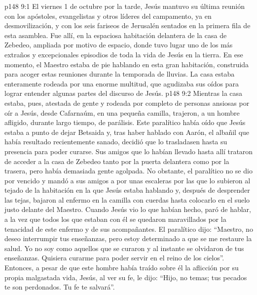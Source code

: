 \vs p148 9:1 El viernes 1 de octubre por la tarde, Jesús mantuvo su última reunión con los apóstoles, evangelistas y otros líderes del campamento, ya en desmovilización, y con los seis fariseos de Jerusalén sentados en la primera fila de esta asamblea. Fue allí, en la espaciosa habitación delantera de la casa de Zebedeo, ampliada por motivo de espacio, donde tuvo lugar uno de los más extraños y excepcionales episodios de toda la vida de Jesús en la tierra. En ese momento, el Maestro estaba de pie hablando en esta gran habitación, construida para acoger estas reuniones durante la temporada de lluvias. La casa estaba enteramente rodeada por una enorme multitud, que agudizaba sus oídos para lograr entender algunas partes del discurso de Jesús.
\vs p148 9:2 Mientras la casa estaba, pues, atestada de gente y rodeada por completo de personas ansiosas por oír a Jesús, desde Cafarnaúm, en una pequeña camilla, trajeron, a un hombre afligido, durante largo tiempo, de parálisis. Este paralítico había oído que Jesús estaba a punto de dejar Betsaida y, tras haber hablado con Aarón, el albañil que había resultado recientemente sanado, decidió que lo trasladasen hasta su presencia para poder curarse. Sus amigos que lo habían llevado hasta allí trataron de acceder a la casa de Zebedeo tanto por la puerta delantera como por la trasera, pero había demasiada gente agolpada. No obstante, el paralítico no se dio por vencido y mandó a sus amigos a por unas escaleras por las que lo subieron al tejado de la habitación en la que Jesús estaba hablando y, después de desprender las tejas, bajaron al enfermo en la camilla con cuerdas hasta colocarlo en el suelo justo delante del Maestro. Cuando Jesús vio lo que habían hecho, paró de hablar, a la vez que todos los que estaban con él se quedaron maravillados por la tenacidad de este enfermo y de sus acompañantes. El paralítico dijo: “Maestro, no deseo interrumpir tus enseñanzas, pero estoy determinado a que se me restaure la salud. Yo no soy como aquellos que se curaron y al instante se olvidaron de tus enseñanzas. Quisiera curarme para poder servir en el reino de los cielos”. Entonces, a pesar de que este hombre había traído sobre él la aflicción por su propia malgastada vida, Jesús, al ver su fe, le dijo: “Hijo, no temas; tus pecados te son perdonados. Tu fe te salvará”.
